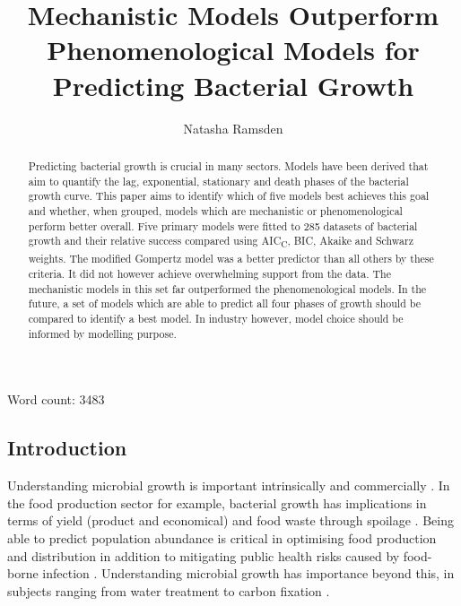 \documentclass[11pt]{article}
\title{Mechanistic Models Outperform Phenomenological Models for Predicting Bacterial Growth}
\author[1]{Natasha Ramsden}
\affil[1]{Imperial College London}
\date{}
\begin{document}
    \begin{titlepage}
    \maketitle
    \thispagestyle{empty}
    
    \begin{center}
        Word count: 3483
    \end{center}
    
    \end{titlepage}

    \begin{linenumbers}
    
    \begin{abstract}
        
        Predicting bacterial growth is crucial in many sectors. Models have been derived that aim to quantify the lag, exponential, stationary and death phases of the bacterial growth curve. This paper aims to identify which of five models best achieves this goal and whether, when grouped, models which are mechanistic or phenomenological perform better overall. Five primary models were fitted to 285 datasets of bacterial growth and their relative success compared using AIC\textsubscript{C}, BIC, Akaike and Schwarz weights. The modified Gompertz model was a better predictor than all others by these criteria. It did not however achieve overwhelming support from the data. The mechanistic models in this set far outperformed the phenomenological models. In the future, a set of models which are able to predict all four phases of growth should be compared to identify a best model. In industry however, model choice should be informed by modelling purpose.

    \end{abstract}


    \section{Introduction}
    
        Understanding microbial growth is important intrinsically and commercially \citep{najafpour_chapter_2007}. In the food production sector for example, bacterial growth has implications in terms of yield (product and economical) and food waste through spoilage \citep{zwietering_modeling_1990}. Being able to predict population abundance is critical in optimising food production and distribution in addition to mitigating public health risks caused by food-borne infection \citep{ross_modeling_2003, mahdinia_microbial_2020}. Understanding microbial growth has importance beyond this, in subjects ranging from water treatment to carbon fixation \citep{esser_modeling_2015}.
        

\end{linenumbers}
\end{document}
